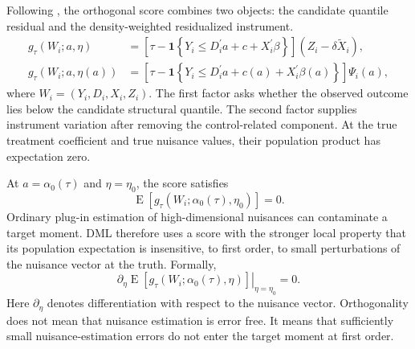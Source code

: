 Following \textcite{chen_huang_tien_2021}, the orthogonal score combines two objects: the candidate quantile residual and the density-weighted residualized instrument.
\begin{equation}
    \begin{aligned}
        g_{\tau}(W_i;a,\eta)
        &=
        \left[
            \tau-\mathbf{1}\!\left\{
                Y_i\leq D_i^{\prime}a+c+X_i^{\prime}\beta
            \right\}
        \right]
        \left(Z_i-\delta\widetilde X_i\right),\\
        g_{\tau}(W_i;a,\eta(a))
        &=
        \left[
            \tau-\mathbf{1}\!\left\{
                Y_i\leq D_i^{\prime}a+c(a)+X_i^{\prime}\beta(a)
            \right\}
        \right]\Psi_i(a),
    \end{aligned}
    \label{eq:orthogonal-score}
\end{equation}
where $W_i=(Y_i,D_i,X_i,Z_i)$. The first factor asks whether the observed outcome lies below the candidate structural quantile. The second factor supplies instrument variation after removing the control-related component. At the true treatment coefficient and true nuisance values, their population product has expectation zero.

At $a=\alpha_0(\tau)$ and $\eta=\eta_0$, the score satisfies
\begin{equation}
    \operatorname{E}\!\left[
        g_{\tau}\!\left(W_i;\alpha_0(\tau),\eta_0\right)
    \right]
    =0.
    \label{eq:orthogonal-score-moment}
\end{equation}
Ordinary plug-in estimation of high-dimensional nuisances can contaminate a target moment. DML therefore uses a score with the stronger local property that its population expectation is insensitive, to first order, to small perturbations of the nuisance vector at the truth. Formally,
\begin{equation}
    \left.
    \partial_{\eta}
    \operatorname{E}\!\left[
        g_{\tau}\!\left(W_i;\alpha_0(\tau),\eta\right)
    \right]
    \right|_{\eta=\eta_0}
    =0.
    \label{eq:neyman-orthogonality}
\end{equation}
Here $\partial_{\eta}$ denotes differentiation with respect to the nuisance vector. Orthogonality does not mean that nuisance estimation is error free. It means that sufficiently small nuisance-estimation errors do not enter the target moment at first order.

